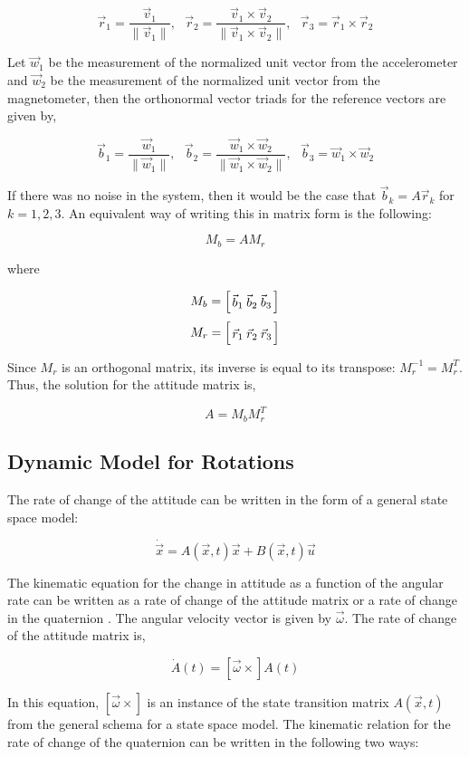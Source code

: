 \documentclass{article}
\newcommand{\mat}[2][ccccccccccccccccccccccccccccccccccccccccccccc]{\left[
        \arraycolsep=1.2pt\def\arraystretch{1.5}
        \begin{array}{#1} #2 \\ 
        \end{array} 
        \right]}
\newcommand{\tab}{\text{ \ \ \ \ }}
\begin{document}
\begin{flushleft}
$$ \vec{r}_1 = \frac{\vec{v}_1}{\| \vec{v}_1 \|}, \tab \vec{r}_2 = \frac{\vec{v}_1 \times \vec{v}_2}{\| \vec{v}_1 \times \vec{v}_2 \|}, \tab \vec{r}_3 = \vec{r}_1 \times \vec{r}_2 $$

Let $\vec{w}_1$ be the measurement of the normalized unit vector from the accelerometer and $\vec{w}_2$ be the measurement of the normalized unit vector from the magnetometer, then the orthonormal vector triads for the reference vectors are given by, 

$$ \vec{b}_1 = \frac{\vec{w}_1}{\| \vec{w}_1 \|}, \tab \vec{b}_2 = \frac{\vec{w}_1 \times \vec{w}_2}{\| \vec{w}_1 \times \vec{w}_2 \|}, \tab \vec{b}_3 = \vec{w}_1 \times \vec{w}_2 $$

If there was no noise in the system, then it would be the case that $\vec{b}_k = A \vec{r}_k$ for $k=1,2,3$. An equivalent way of writing this in matrix form is the following: 

$$ M_b = A M_r $$ 

where 

$$ M_b = \mat{ \vec{b}_1 & \vec{b}_2 & \vec{b}_3 } $$
$$ M_r = \mat{ \vec{r}_1 & \vec{r}_2 & \vec{r}_3 } $$

Since $M_r$ is an orthogonal matrix, its inverse is equal to its transpose: $M_r^{-1} = M_r^{T}$. Thus, the solution for the attitude matrix is, 

$$ A = M_b M_r^{T} $$

\subsection{Dynamic Model for Rotations}

The rate of change of the attitude can be written in the form of a general state space model: 

\[ \dot{\vec{x}} = A(\vec{x}, t) \vec{x} + B(\vec{x}, t) \vec{u} \]

The kinematic equation for the change in attitude as a function of the angular rate can be written as a rate of change of the attitude matrix or a rate of change in the quaternion \cite{Shuster1982}. The angular velocity vector is given by $\vec{\omega}$. The rate of change of the attitude matrix is, 

\[ \dot{A}(t) = [\vec{\omega}\times] A(t) \]

In this equation, $[\vec{\omega}\times]$ is an instance of the state transition matrix $A(\vec{x}, t)$ from the general schema for a state space model. The kinematic relation for the rate of change of the quaternion can be written in the following two ways: 


\end{flushleft}
\end{document}
